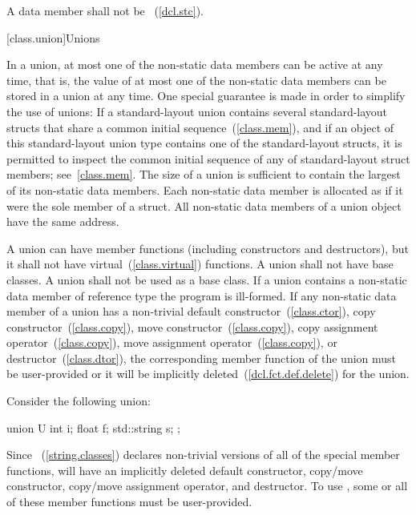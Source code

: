 \pnum
A  data member shall not be
~(\ref{dcl.stc}).

[class.union]{Unions}%

\pnum
In a union, at most one of the non-static data members can be active at any
time, that is, the value of at most one of the non-static data members can be
stored in a union at any time. \enternote One special guarantee is made in order to
simplify the use of unions: If a standard-layout union contains several standard-layout
structs that share a common initial sequence~(\ref{class.mem}), and if an object of this
standard-layout union type contains one of the standard-layout structs, it is permitted
to inspect the common initial sequence of any of standard-layout struct members;
see~\ref{class.mem}. \exitnote The size of a union is sufficient to contain the largest
of its non-static data members. Each non-static data member is allocated
as if it were the sole member of a struct. All non-static data members of a
union object have the same address.

\pnum
{}%
%
%
A union can have member functions (including constructors and destructors),
%
but it shall not have virtual~(\ref{class.virtual}) functions. A union shall not have
base classes. A union shall not be used as a base class.
%
If a union contains a non-static data member of
reference type the program is ill-formed.
\enternote If any non-static data member of a union has a non-trivial
default constructor~(\ref{class.ctor}),
copy constructor~(\ref{class.copy}),
move constructor~(\ref{class.copy}),
copy assignment operator~(\ref{class.copy}),
move assignment operator~(\ref{class.copy}),
or destructor~(\ref{class.dtor}), the corresponding member function
of the union must be user-provided or it will
be implicitly deleted~(\ref{dcl.fct.def.delete}) for the union. \exitnote

\pnum
\enterexample Consider the following union:

\begin{codeblock}
union U {
  int i;
  float f;
  std::string s;
};
\end{codeblock}

Since ~(\ref{string.classes}) declares non-trivial versions of all of the special
member functions,  will have an implicitly deleted default constructor,
copy/move constructor,
copy/move assignment operator, and destructor.
To use , some or all of these member functions
must be user-provided.\exitexample

